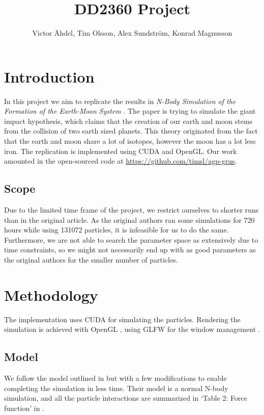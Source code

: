 \documentclass[a4paper]{article}
\title{DD2360 Project}
\author{Victor Ähdel, Tim Olsson, Alex Sundström, Konrad Magnusson}
\begin{document}
\maketitle

\section{Introduction}

In this project we aim to replicate the results in \emph{N-Body Simulation of the Formation of the Earth-Moon System} \cite{simulation_paper}.
The paper is trying to simulate the giant impact hypothesis, which claims that the creation of our earth and moon stems from the collision of two earth sized planets.
This theory originated from the fact that the earth and moon share a lot of isotopes, however the moon has a lot less iron.
The replication is implemented using CUDA and OpenGL.
Our work amounted in the open-sourced code at \url{https://github.com/timsl/agp-grus}.

\subsection{Scope}

Due to the limited time frame of the project, we restrict ourselves to shorter runs than in the original article.
As the original authors ran some simulations for 720 hours while using 131072 particles, it is infeasible for us to do the same.
Furthermore, we are not able to search the parameter space as extensively due to time constraints, so we might not necessarily end up with as good parameters as the original authors for the smaller number of particles.

\section{Methodology}

The implementation uses CUDA \cite{Cuda} for simulating the particles.
Rendering the simulation is achieved with OpenGL \cite{opengl}, using GLFW for the window management \cite{glfw}.

\subsection{Model}

We follow the model outlined in \cite{simulation_paper} but with a few modifications to enable completing the simulation in less time.
Their model is a normal N-body simulation, and all the particle interactions are summarized in `Table 2: Force function' in \cite{simulation_paper}.
\end{document}
